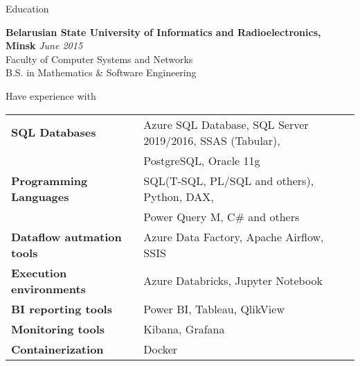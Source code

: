 \documentclass{resume} %
\begin{document}

\begin{rSection}{Education}

{\bf Belarusian State University of Informatics and Radioelectronics, Minsk} \hfill {\em June 2015} \\ 
Faculty of Computer Systems and Networks \\
B.S. in Mathematics \& Software Engineering \\

\end{rSection}


\begin{rSection}{Have experience with}

\begin{tabular}{ @{} >{\bfseries}l @{\hspace{6ex}} l }
SQL Databases          & Azure SQL Database, SQL Server 2019/2016, SSAS (Tabular), \smallskip \\
 & PostgreSQL, Oracle 11g \smallskip \\
Programming Languages  & SQL(T-SQL, PL/SQL and others), Python, DAX, \smallskip \\
 & Power Query M, C\# and others \smallskip \\
Dataflow autmation tools & Azure Data Factory, Apache Airflow, SSIS \smallskip \\
Execution environments & Azure Databricks, Jupyter Notebook \smallskip \\
BI reporting tools               & Power BI, Tableau, QlikView \smallskip \\
Monitoring tools       & Kibana, Grafana \smallskip \\
Containerization       & Docker \smallskip \\
\end{tabular}

\end{rSection}

\end{document}
